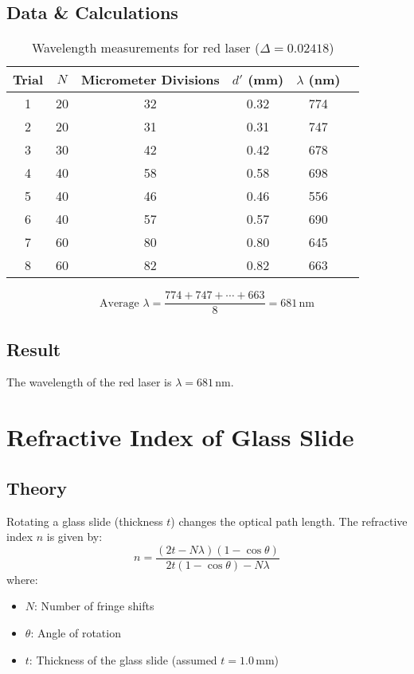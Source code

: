 \documentclass{article}
\begin{document}
\subsection{Data \& Calculations}
\begin{table}[h]
    \centering
    \caption{Wavelength measurements for red laser (\( \Delta = 0.02418 \))}
    \begin{tabular}{cccccc}
        \toprule
        Trial & \( N \) & Micrometer Divisions & \( d' \) (mm) & \( \lambda \) (nm) \\
        \midrule
        1 & 20 & 32 & 0.32 & 774 \\
        2 & 20 & 31 & 0.31 & 747 \\
        3 & 30 & 42 & 0.42 & 678 \\
        4 & 40 & 58 & 0.58 & 698 \\
        5 & 40 & 46 & 0.46 & 556 \\
        6 & 40 & 57 & 0.57 & 690 \\
        7 & 60 & 80 & 0.80 & 645 \\
        8 & 60 & 82 & 0.82 & 663 \\
        \bottomrule
    \end{tabular}
\end{table}
\[
\text{Average } \lambda = \frac{774 + 747 + \cdots + 663}{8} = 681 \, \text{nm}
\]

\subsection{Result}
The wavelength of the red laser is \( \lambda = \boxed{681 \, \text{nm}} \).

\section{Refractive Index of Glass Slide}
\subsection{Theory}
Rotating a glass slide (thickness \( t \)) changes the optical path length. The refractive index \( n \) is given by:
\[
n = \frac{(2t - N\lambda)(1 - \cos\theta)}{2t(1 - \cos\theta) - N\lambda}
\]
where:
\begin{itemize}
    \item \( N \): Number of fringe shifts
    \item \( \theta \): Angle of rotation
    \item \( t \): Thickness of the glass slide (assumed \( t = 1.0 \, \text{mm} \))
\end{itemize}
\end{document}
